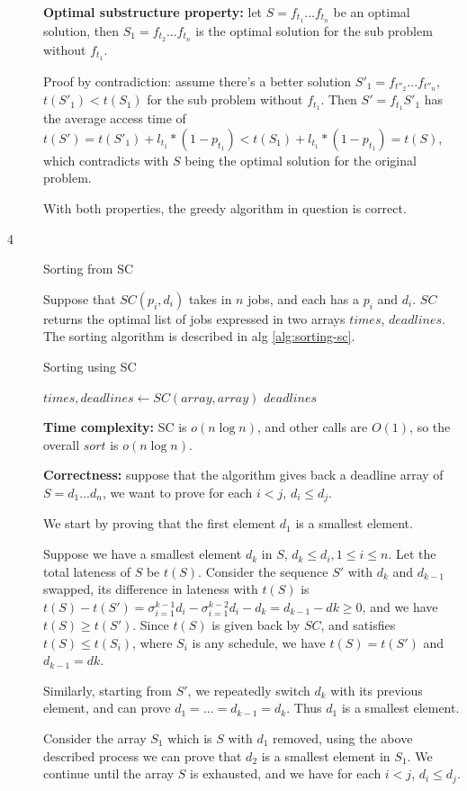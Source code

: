 \documentclass{article}
\begin{document}
\begin{description}
  \textbf{Optimal substructure property:} let $S=f_{t_1}...f_{t_n}$ be an optimal solution, then $S_1=f_{t_2}...f_{t_n}$ is the optimal solution for the sub problem without $f_{t_1}$.

  Proof by contradiction: assume there's a better solution $S'_1=f_{t''_2}...f_{t''_n}$, $t(S'_1)<t(S_1)$ for the sub problem without $f_{t_1}$. Then $S'=f_{t_1}S'_1$ has the average access time of $t(S')=t(S'_1) + l_{t_1} * (1-p_{t_1}) < t(S_1) + l_{t_1} * (1-p_{t_1}) = t(S)$, which contradicts with $S$ being the optimal solution for the original problem.

  With both properties, the greedy algorithm in question is correct.

\item[4]{Sorting from SC}
  
  Suppose that $SC(p_i, d_i)$ takes in $n$ jobs, and each has a $p_i$ and $d_i$. $SC$ returns the optimal list of jobs expressed in two arrays $times$, $deadlines$. The sorting algorithm is described in alg \ref{alg:sorting-sc}.

  \begin{algorithm}[h]
  \caption{Sorting using SC}
  \label{alg:sorting-sc}
    \begin{algorithmic}[1]
  
      \State $times, deadlines \gets SC(array, array)$
      \State \Return $deadlines$
    \EndFunction
    
    \end{algorithmic}
  \end{algorithm}

  \textbf{Time complexity:} SC is $o(n \log n)$, and other calls are $O(1)$, so the overall $sort$ is $o(n \log n)$.

  \textbf{Correctness:} suppose that the algorithm gives back a deadline array of $S=d_1...d_n$, we want to prove for each $i<j$, $d_i \leq d_j$.

  We start by proving that the first element $d_1$ is a smallest element. 

  Suppose we have a smallest element $d_k$ in $S$, $d_k \leq d_i, 1 \leq i \leq n$. Let the total lateness of $S$ be $t(S)$. Consider the sequence $S'$ with $d_k$ and $d_{k-1}$ swapped, its difference in lateness with $t(S)$ is $t(S) - t(S') = \sigma_{i=1}^{k-1}{d_i} - \sigma_{i=1}^{k-2}{d_i} - d_k = d_{k-1} - d{k} \geq 0$, and we have $t(S) \geq t(S')$. Since $t(S)$ is given back by $SC$, and satisfies $t(S) \leq t(S_i)$, where $S_i$ is any schedule, we have $t(S) = t(S')$ and $d_{k-1} = d{k}$. 

  Similarly, starting from $S'$, we repeatedly switch $d_k$ with its previous element, and can prove $d_1 =...= d_{k-1} = d_k$. Thus $d_1$ is a smallest element.

  Consider the array $S_1$ which is $S$ with $d_1$ removed, using the above described process we can prove that $d_2$ is a smallest element in $S_1$. We continue until the array $S$ is exhausted, and we have for each $i<j$, $d_i \leq d_j$.

\end{description}
\end{document}
